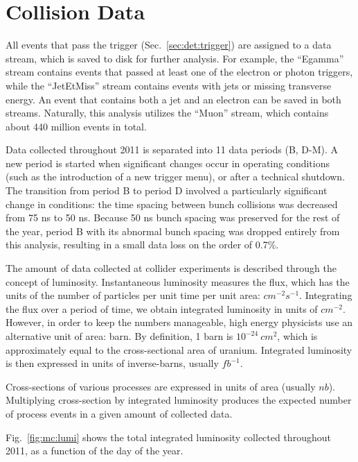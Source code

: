 \section{Collision Data}
\label{mc:sec:coldata}

All events that pass the trigger (Sec.~\ref{sec:det:trigger}) are assigned to a data stream, which is saved to disk for further analysis. For example, the ``Egamma'' stream contains events that passed at least one of the electron or photon triggers, while the ``JetEtMiss'' stream contains events with jets or missing transverse energy. An event that contains both a jet and an electron can be saved in both streams. Naturally, this analysis utilizes the ``Muon'' stream, which contains about 440 million events in total.

Data collected throughout 2011 is separated into 11 data periods (B, D-M). A new period is started when significant changes occur in operating conditions (such as the introduction of a new trigger menu), or after a technical shutdown. The transition from period B to period D involved a particularly significant change in conditions: the time spacing between bunch collisions was decreased from 75 ns to 50 ns. Because 50 ns bunch spacing was preserved for the rest of the year, period B with its abnormal bunch spacing was dropped entirely from this analysis, resulting in a small data loss on the order of 0.7\%.

The amount of data collected at collider experiments is described through the concept of luminosity. Instantaneous luminosity measures the flux, which has the units of the number of particles per unit time per unit area: $cm^{-2} s^{-1}$. Integrating the flux over a period of time, we obtain integrated luminosity in units of $cm^{-2}$. However, in order to keep the numbers manageable, high energy physicists use an alternative unit of area: barn. By definition, 1 barn is $10^{-24}~cm^2$, which is approximately equal to the cross-sectional area of uranium. Integrated luminosity is then expressed in units of inverse-barns, usually $fb^{-1}$.

Cross-sections of various processes are expressed in units of area (usually $nb$). Multiplying cross-section by integrated luminosity produces the expected number of process events in a given amount of collected data. 

Fig.~\ref{fig:mc:lumi} shows the total integrated luminosity collected throughout 2011, as a function of the day of the year.

